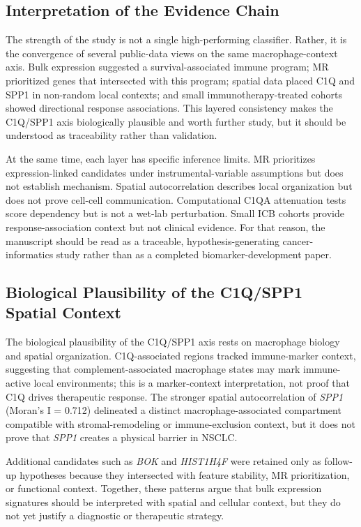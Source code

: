 \documentclass[pdflatex,sn-mathphys-num,referee,lineno]{sn-jnl}
\theoremstyle{thmstyleone}%
\theoremstyle{thmstyletwo}%
\theoremstyle{thmstylethree}%
\begin{document}
\subsection{Interpretation of the Evidence Chain}

The strength of the study is not a single high-performing classifier. Rather, it is the convergence of several public-data views on the same macrophage-context axis. Bulk expression suggested a survival-associated immune program; MR prioritized genes that intersected with this program; spatial data placed C1Q and SPP1 in non-random local contexts; and small immunotherapy-treated cohorts showed directional response associations. This layered consistency makes the C1Q/SPP1 axis biologically plausible and worth further study, but it should be understood as traceability rather than validation.

At the same time, each layer has specific inference limits. MR prioritizes expression-linked candidates under instrumental-variable assumptions but does not establish mechanism. Spatial autocorrelation describes local organization but does not prove cell-cell communication. Computational C1QA attenuation tests score dependency but is not a wet-lab perturbation. Small ICB cohorts provide response-association context but not clinical evidence. For that reason, the manuscript should be read as a traceable, hypothesis-generating cancer-informatics study rather than as a completed biomarker-development paper.

\subsection{Biological Plausibility of the C1Q/SPP1 Spatial Context}

The biological plausibility of the C1Q/SPP1 axis rests on macrophage biology and spatial organization. C1Q-associated regions tracked immune-marker context, suggesting that complement-associated macrophage states may mark immune-active local environments; this is a marker-context interpretation, not proof that C1Q drives therapeutic response. The stronger spatial autocorrelation of \textit{SPP1} (Moran's I = 0.712) delineated a distinct macrophage-associated compartment compatible with stromal-remodeling or immune-exclusion context, but it does not prove that \textit{SPP1} creates a physical barrier in NSCLC.

Additional candidates such as \textit{BOK} and \textit{HIST1H4F} were retained only as follow-up hypotheses because they intersected with feature stability, MR prioritization, or functional context. Together, these patterns argue that bulk expression signatures should be interpreted with spatial and cellular context, but they do not yet justify a diagnostic or therapeutic strategy.
\end{document}
